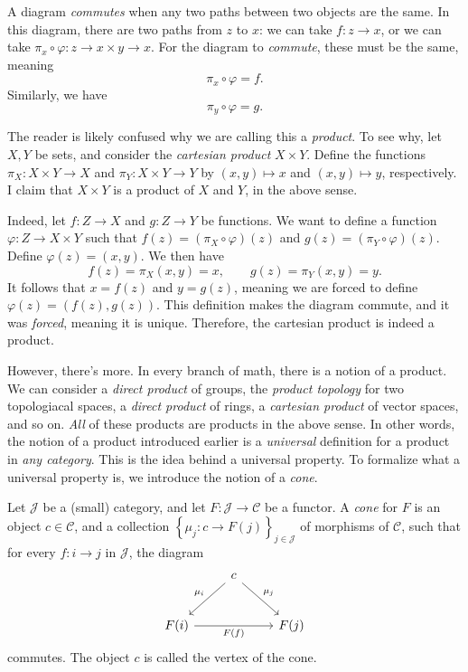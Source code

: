 \documentclass[11pt, A4]{article}
\begin{document}
A diagram \emph{commutes} when any two paths between two objects are the same. In this diagram, there are two paths from $z$ to $x$: we can take $f : z \to x$, or we can take $\pi _x \circ \varphi : z \to x\times y\to x$. For the diagram to \emph{commute}, these must be the same, meaning
\[
	\pi _x\circ \varphi =f
.\]
Similarly, we have
\[
	\pi _y\circ \varphi =g
.\]

The reader is likely confused why we are calling this a \emph{product}. To see why, let $X,Y$ be sets, and consider the \emph{cartesian product} $X\times Y$. Define the functions $\pi _X : X\times Y \to X$ and $\pi _Y : X\times Y \to Y$ by $(x,y)\mapsto x$ and $(x,y)\mapsto y$, respectively. I claim that $X\times Y$ is a product of $X$ and $Y$, in the above sense.

Indeed, let $f : Z \to X$ and $g : Z \to Y$ be functions. We want to define a function $\varphi : Z \to X\times Y$ such that $f(z)=(\pi _X\circ \varphi )(z)$ and $g(z)=(\pi _Y\circ \varphi )(z)$. Define $\varphi (z)=(x,y)$. We then have
\[
	f(z)=\pi _X(x,y)=x,\qquad g(z)=\pi _Y(x,y)=y
.\]
It follows that $x=f(z)$ and $y=g(z)$, meaning we are forced to define $\varphi (z)=(f(z),g(z))$. This definition makes the diagram commute, and it was \emph{forced}, meaning it is unique. Therefore, the cartesian product is indeed a product.

However, there's more. In every branch of math, there is a notion of a product. We can consider a \emph{direct product} of groups, the \emph{product topology} for two topologiacal spaces, a \emph{direct product} of rings, a \emph{cartesian product} of vector spaces, and so on. \emph{All} of these products are products in the above sense. In other words, the notion of a product introduced earlier is a \emph{universal} definition for a product in \emph{any category}. This is the idea behind a universal property. To formalize what a universal property is, we introduce the notion of a \emph{cone}.

\begin{definition}\label{4.2}
	Let $\mathcal{J} $ be a (small) category, and let $F : \mathcal{J}  \to \mathcal{C} $ be a functor. A \emph{cone} for $F$ is an object $c\in \mathcal{C} $, and a collection $\left\{ \mu_j : c \to F(j) \right\}_{j\in \mathcal{J} } $ of morphisms of $\mathcal{C} $, such that for every $f : i \to j$ in $\mathcal{J} $, the diagram
	\[\begin{tikzcd}[row sep = 2.5em, column sep = 2.5em]
	 & c \ar[" \mu_j ", dr] \ar[" \mu _i "', dl]  &  \\
	F(i)\ar[" F(f) "', rr]  &  & F(j)
	\end{tikzcd}\]
	commutes. The object $c$ is called the vertex of the cone.
\end{definition}
\end{document}
